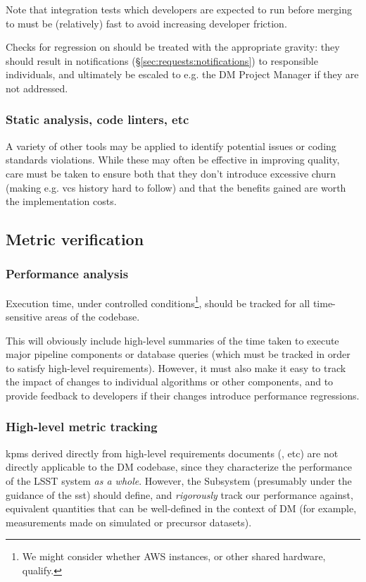 \documentclass[DM,authoryear,toc,lsstdraft]{lsstdoc}
\begin{document}
Note that integration tests which developers are expected to run before
merging to  must be (relatively) fast to avoid increasing
developer friction.

Checks for regression on  should be treated with the appropriate
gravity: they should result in notifications
(\S\ref{sec:requests:notifications}) to responsible individuals, and
ultimately be escaled to e.g. the DM Project Manager if they are not
addressed.

\subsubsection{Static analysis, code linters, etc}

A variety of other tools may be applied to identify potential issues or coding
standards violations. While these may often be effective in improving quality,
care must be taken to ensure both that they don't introduce excessive churn
(making e.g. \gls{vcs} history hard to follow) and that the benefits gained
are worth the implementation costs.

\subsection{Metric verification}

\subsubsection{Performance analysis}

Execution time, under controlled conditions\footnote{We might consider whether
AWS instances, or other shared hardware, qualify.}, should be tracked for all
time-sensitive areas of the codebase.

This will obviously include high-level summaries of the time taken to execute
major pipeline components or database queries (which must be tracked in order
to satisfy high-level requirements). However, it must also make it easy to
track the impact of changes to individual algorithms or other components, and
to provide feedback to developers if their changes introduce performance
regressions.

\subsubsection{High-level metric tracking}
\label{sec:requests:kpmtrack}

\Glspl{kpm} derived directly from high-level requirements documents
(, etc) are not directly applicable to the DM
codebase, since they characterize the performance of the LSST system
\textit{as a whole}. However, the Subsystem (presumably under the guidance of
the \gls{sst}) should define, and \textit{rigorously} track our performance
against, equivalent quantities that can be well-defined in the context of DM
(for example, measurements made on simulated or precursor datasets).
\end{document}

